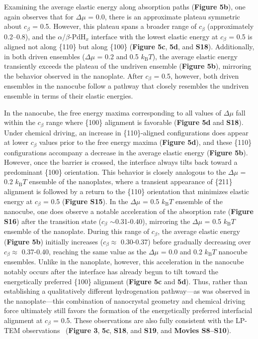 \documentclass[reprint,amsmath,amssymb,aip,nofootinbib, citeautoscript,]{revtex4-2}
\begin{document}
Examining the average elastic energy along absorption paths (\textbf{Figure 5b}), one again observes that for $\Delta$$\mu$ = 0.0, there is an approximate plateau symmetric about $c_\beta$ = 0.5. However, this plateau spans a broader range of $c_\beta$ (approximately 0.2–0.8), and the $\alpha$/$\beta$-$\mathrm{PdH}_x$ interface with the lowest elastic energy at $c_\beta$ = 0.5 is aligned not along \{110\} but along \{100\} (\textbf{Figure 5c}, \textbf{5d}, and \textbf{S18}). Additionally, in both driven ensembles ($\Delta$$\mu$ = 0.2 and 0.5 $k_\mathrm{B}T$), the average elastic energy transiently exceeds the plateau of the undriven ensemble (\textbf{Figure 5b}), mirroring the behavior observed in the nanoplate. After $c_\beta$ = 0.5, however, both driven ensembles in the nanocube follow a pathway that closely resembles the undriven ensemble in terms of their elastic energies.


In the nanocube, the free energy maxima corresponding to all values of $\Delta$$\mu$ fall within the $c_\beta$ range where \{100\} alignment is favorable (\textbf{Figure 5d} and \textbf{S18}). Under chemical driving, an increase in \{110\}-aligned configurations does appear at lower $c_\beta$ values prior to the free energy maxima (\textbf{Figure 5d}), and these \{110\} configurations accompany a decrease in the average elastic energy (\textbf{Figure 5b}). However, once the barrier is crossed, the interface always tilts back toward a predominant \{100\} orientation. This behavior is closely analogous to the $\Delta$$\mu$ = 0.2 $k_\mathrm{B}T$ ensemble of the nanoplates, where a transient appearance of \{211\} alignment is followed by a return to the \{110\} orientation that minimizes elastic energy at $c_\beta$ = 0.5 (\textbf{Figure S15}). In the $\Delta$$\mu$ = 0.5 $k_\mathrm{B}T$ ensemble of the nanocube, one does observe a notable acceleration of the absorption rate (\textbf{Figure S16}) after the transition state ($c_\beta$ $\sim$0.31-0.40), mirroring the $\Delta\mu$ = 0.5 $k_\mathrm{B}T$ ensemble of the nanoplate. During this range of $c_\beta$, the average elastic energy (\textbf{Figure 5b}) initially increases ($c_\beta \approx$ 0.30-0.37) before gradually decreasing over $c_\beta \approx$ 0.37-0.40, reaching the same value as the $\Delta\mu$ = 0.0 and 0.2 $k_\mathrm{B}T$ nanocube ensembles. Unlike in the nanoplate, however, this acceleration in the nanocube notably occurs after the interface has already begun to tilt toward the energetically preferred \{100\} alignment (\textbf{Figure 5c} and \textbf{5d}). Thus, rather than establishing a qualitatively different hydrogenation pathway—as was observed in the nanoplate—this combination of nanocrystal geometry and chemical driving force ultimately still favors the formation of the energetically preferred interfacial alignment at $c_\beta$ = 0.5. These observations are also fully consistent with the LP-TEM observations~\cite{lee_atomic_2024} (\textbf{Figure 3}, \textbf{5c}, \textbf{S18}, and \textbf{S19}, and \textbf{Movies S8–S10}).
\end{document}
